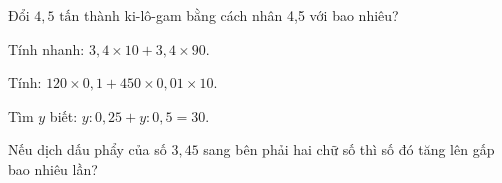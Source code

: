 \begin{ex}
  Đổi $4{,}5\text{ tấn}$ thành ki-lô-gam bằng cách nhân 4,5 với bao nhiêu?
\end{ex}

\begin{ex}
  Tính nhanh: $3{,}4 \times 10 + 3{,}4 \times 90$.
\end{ex}

\begin{ex}
  Tính: $120 \times 0{,}1 + 450 \times 0{,}01 \times 10$.
\end{ex}

\begin{ex}
  Tìm $y$ biết: $y : 0{,}25 + y : 0{,}5 = 30$.
\end{ex}

\begin{ex}
  Nếu dịch dấu phẩy của số $3{,}45$ sang bên phải hai chữ số thì số đó tăng lên gấp bao nhiêu lần?
\end{ex}
